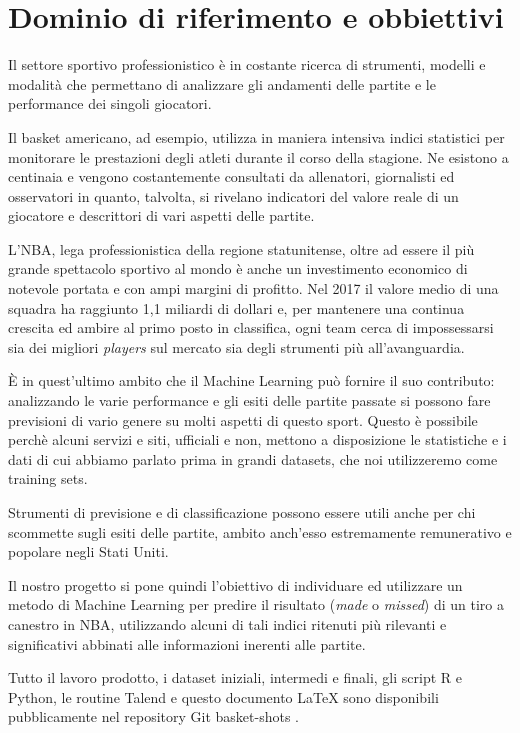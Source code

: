 \section{Dominio di riferimento e obbiettivi}
Il settore sportivo professionistico è in costante ricerca di strumenti, modelli e modalità che permettano di analizzare gli andamenti delle partite e le performance dei singoli giocatori.

Il basket americano, ad esempio, utilizza in maniera intensiva indici statistici per monitorare le prestazioni degli atleti durante il corso della stagione. Ne esistono a centinaia e vengono costantemente consultati da allenatori, giornalisti ed osservatori in quanto, talvolta, si rivelano indicatori del valore reale di un giocatore e descrittori di vari aspetti delle partite.
\par
L’NBA, lega professionistica della regione statunitense, oltre ad essere il più grande spettacolo sportivo al mondo è anche un investimento economico di notevole portata e con ampi margini di profitto. Nel 2017 il valore medio di una squadra ha raggiunto 1,1 miliardi di dollari e, per mantenere una continua crescita ed ambire al primo posto in classifica, ogni team cerca di impossessarsi sia dei migliori \textit{players} sul mercato sia degli strumenti più all’avanguardia.
\par
È in quest’ultimo ambito che il Machine Learning può fornire il suo contributo: analizzando le varie performance e gli esiti delle partite passate si possono fare previsioni di vario genere su molti aspetti di questo sport. 
Questo è possibile perchè alcuni servizi e siti, ufficiali e non, mettono a disposizione le statistiche e i dati di cui abbiamo parlato prima in grandi datasets, che noi utilizzeremo come training sets.
\par
Strumenti di previsione e di classificazione possono essere utili anche per chi scommette sugli esiti delle partite, ambito anch’esso estremamente remunerativo e popolare negli Stati Uniti.
\par
Il nostro progetto si pone quindi l'obiettivo di individuare ed utilizzare un metodo di Machine Learning per predire il risultato (\textit{made} o \textit{missed}) di un tiro a canestro in NBA, utilizzando alcuni di tali indici ritenuti più rilevanti e significativi abbinati alle informazioni inerenti alle partite.
\par
Tutto il lavoro prodotto, i dataset iniziali, intermedi e finali, gli script R e Python, le routine Talend e questo documento \LaTeX{} sono disponibili pubblicamente nel repository Git basket-shots \cite{repo}.